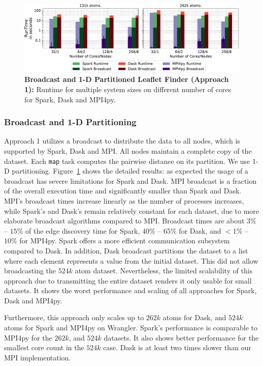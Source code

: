 \begin{figure}[ht]
    \centering
    \includegraphics[width=.95\textwidth]{figures/data_analytics_hpc/task_par/spark_dask_lf_approach1.pdf}
    \caption{\textbf{Broadcast and 1-D Partitioned Leaflet Finder (Approach 1):}
    Runtime for multiple system sizes on different number of cores for Spark, Dask and MPI4py.}
    \label{fig:WranglerLeafLetFinderApp1}
\end{figure}

\subsubsection*{Broadcast and 1-D Partitioning}
Approach 1 utilizes a broadcast to distribute the data to all nodes, which is supported by Spark, Dask and MPI.
All nodes maintain a complete copy of the dataset.
Each \texttt{map} task computes the pairwise distance on its partition.
We use 1-D partitioning.
Figure~\ref{fig:WranglerLeafLetFinderApp1} shows the detailed results: as expected the usage of a broadcast has severe limitations for Spark and Dask.
MPI broadcast is a fraction of the overall execution time and significantly smaller than Spark and Dask.
MPI's broadcast times increase linearly as the number of processes increases, while Spark's and Dask's remain relatively constant for each dataset, due to more elaborate broadcast algorithms compared to MPI.
Broadcast times are about $3\%$ -- $15\%$ of the edge discovery time for Spark, $40\%$ -- $65\%$ for Dask, and $<1\%$ -- $10\%$ for MPI4py.
Spark offers a more efficient communication subsystem compared to Dask.
In addition, Dask broadcast partitions the dataset to a list where each element represents a value from the initial dataset.
This did not allow broadcasting the $524k$ atom dataset.
Nevertheless, the limited scalability of this approach due to transmitting the entire dataset renders it only usable for small datasets.
It shows the worst performance and scaling of all approaches for Spark, Dask and MPI4py.

Furthermore, this approach only scales up to $262k$ atoms for Dask, and $524k$ atoms for Spark and MPI4py on Wrangler.
Spark's performance is comparable to MPI4py for the $262k$, and $524k$ datasets.
It also shows better performance for the smallest core count in the $524k$ case.
Dask is at least two times slower than our MPI implementation.

